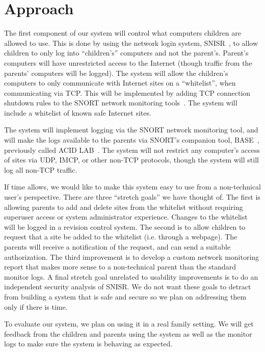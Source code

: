 \documentclass[12pt] {article}
\begin{document}
\section*{Approach}

The first component of our system will control what computers children are
allowed to use. This is done by using the network login system,
SNISR~\cite{snisr}, to allow children to only log into ``children's'' computers
and not the parent's.  Parent's computers will have unrestricted access to the
Internet (though traffic from the parents' computers will be logged). The
system will allow the children's computers to only communicate with Internet
sites on a ``whitelist'', when communicating via TCP.  This will be implemented
by adding TCP connection shutdown rules to the SNORT network monitoring
tools~\cite{snort}. The system will include a whitelist of known safe Internet
sites.

The system will implement logging via the SNORT network monitoring tool, and
will make the logs available to the parents via SNORT's companion tool,
BASE~\cite{base}, previously called ACID LAB~\cite{acidlab}. The system will
not restrict any computer's access of sites via UDP, IMCP, or other non-TCP
protocols, though the system will still log all non-TCP traffic.

If time allows, we would like to make this system easy to use from a
non-technical user's perspective. There are three ``stretch goals'' we have
thought of. The first is allowing parents to add and delete sites from the
whitelist without requiring superuser access or system administrator
experience. Changes to the whitelist will be logged in a revision control
system. The second is to allow children to request that a site be added to the
whitelist (i.e. through a webpage). The parents will receive a notification of
the request, and can send a suitable authorization. The third improvement is to
develop a custom network monitoring report that makes more sense to a
non-technical parent than the standard monitor logs. A final stretch goal
unrelated to usability improvements is to do an independent security analysis
of SNISR. We do not want these goals to detract from building a system that is
safe and secure so we plan on addressing them only if there is time.

To evaluate our system, we plan on using it in a real family setting. We will
get feedback from the children and parents using the system as well as the
monitor logs to make sure the system is behaving as expected.
\end{document}
